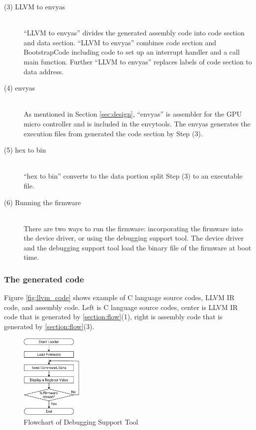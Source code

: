 \begin{description}
\item[ (3) LLVM to envyas]\mbox{}\\
``LLVM to envyas'' divides the generated assembly code into code section and data section.
``LLVM to envyas'' combines code section and BootstrapCode including code to set up an interrupt handler and a call main function.
Further ``LLVM to envyas'' replaces labels of code section to data address.
\item[ (4) envyas]\mbox{}\\
As mentioned in Section \ref{sec:design},
``envyas'' is assembler for the GPU micro controller and is included in the envytools.
The envyas generates the execution files from generated the code section by Step (3).

\item[ (5) hex to bin]\mbox{}\\
``hex to bin'' converts to the data portion split Step (3) to an executable file.

\item[ (6) Running the firmware]\mbox{}\\
There are two ways to run the firmware: incorporating the firmware into the device driver, or using the debugging support tool.
The device driver and the debugging support tool load the binary file of the firmware at boot time.
\end{description}

\subsubsection{The generated code}
Figure \ref{fig:llvm_code} shows example of C language source codes, LLVM IR code, and assembly code.
Left is C language source codes, center is LLVM IR code that is generated by \ref{section:flow}(1), right is assembly code that is generated by \ref{section:flow}(3).

\begin{figure}
\begin{center}
\includegraphics[width=3cm]{./img/loader.pdf}
\end{center}
\caption{Flowchart of Debugging Support Tool}
\label{fig:loader}
\end{figure}

